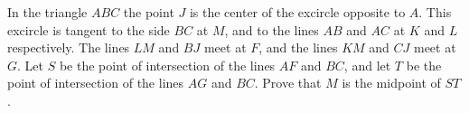 In the triangle $ABC$ the point $J$ is the center of the excircle opposite to $A$. This excircle is tangent to the side $BC$ at $M$, and to the lines $AB$ and $AC$ at $K$ and $L$ respectively. The lines $LM$ and $BJ$ meet at $F$, and the lines $KM$ and $CJ$ meet at $G$. Let $S$ be the point of intersection of the lines $AF$ and $BC$, and let $T$ be the point of intersection of the lines $AG$ and $BC$. Prove that $M$ is the midpoint of $ST$.
